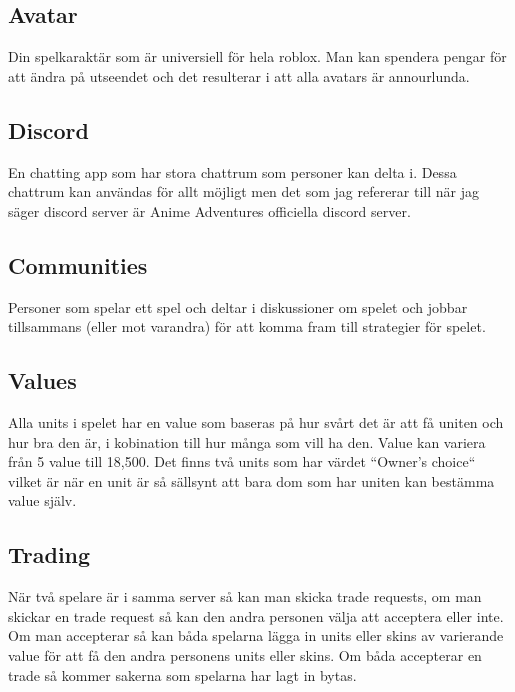 \documentclass[11p]{article}
\begin{document}
\subsection{Avatar} Din spelkaraktär som är universiell för hela roblox. Man kan spendera pengar för att ändra på utseendet och det resulterar i att alla avatars är annourlunda.
\subsection{Discord} En chatting app som har stora chattrum som personer kan delta i. Dessa chattrum kan användas för allt möjligt men det som jag refererar till när jag säger discord server är Anime Adventures officiella discord server.
\subsection{Communities} Personer som spelar ett spel och deltar i diskussioner om spelet och jobbar tillsammans (eller mot varandra) för att komma fram till strategier för spelet.
\subsection{Values} Alla units i spelet har en value som baseras på hur svårt det är att få uniten och hur bra den är, i kobination till hur många som vill ha den. Value kan variera från 5 value till 18,500. Det finns två units som har värdet ``Owner's choice`` vilket är när en unit är så sällsynt att bara dom som har uniten kan bestämma value själv.
\subsection{Trading} När två spelare är i samma server så kan man skicka trade requests, om man skickar en trade request så kan den andra personen välja att acceptera eller inte. Om man accepterar så kan båda spelarna lägga in units eller skins av varierande value för att få den andra personens units eller skins. Om båda accepterar en trade så kommer sakerna som spelarna har lagt in bytas.
\clearpage
    
\end{document}
